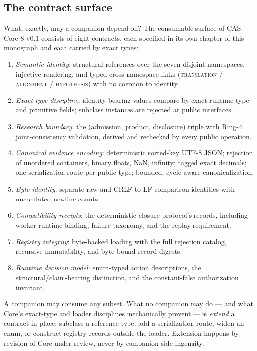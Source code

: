 \subsection{The contract surface}\label{integ:surface}

What, exactly, may a companion depend on? The consumable surface of CAS Core 8 v0.1 consists of eight contracts, each specified in its own chapter of this monograph and each carried by exact types:

\begin{enumerate}
\item \emph{Semantic identity}: structural references over the seven disjoint namespaces, injective rendering, and typed cross-namespace links (\textsc{translation} / \textsc{alignment} / \textsc{hypothesis}) with no coercion to identity.
\item \emph{Exact-type discipline}: identity-bearing values compare by exact runtime type and primitive fields; subclass instances are rejected at public interfaces.
\item \emph{Research boundary}: the (admission, product, disclosure) triple with Ring-4 joint-consistency validation, derived and rechecked by every public operation.
\item \emph{Canonical evidence encoding}: deterministic sorted-key UTF-8 JSON; rejection of unordered containers, binary floats, NaN, infinity; tagged exact decimals; one serialization route per public type; bounded, cycle-aware canonicalization.
\item \emph{Byte identity}: separate raw and CRLF-to-LF comparison identities with unconflated newline counts.
\item \emph{Compatibility receipts}: the deterministic-closure protocol's records, including worker runtime binding, failure taxonomy, and the replay requirement.
\item \emph{Registry integrity}: byte-backed loading with the full rejection catalog, recursive immutability, and byte-bound record digests.
\item \emph{Runtime decision model}: enum-typed action descriptions, the structural/claim-bearing distinction, and the constant-false authorization invariant.
\end{enumerate}

A companion may consume any subset. What no companion may do --- and what Core's exact-type and loader disciplines mechanically prevent --- is \emph{extend} a contract in place: subclass a reference type, add a serialization route, widen an enum, or construct registry records outside the loader. Extension happens by revision of Core under review, never by companion-side ingenuity.

